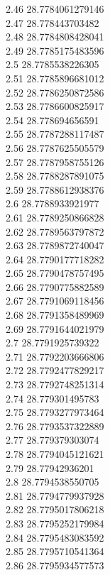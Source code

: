 {2.46	28.7784061279146\\
2.47	28.778443703482\\
2.48	28.7784808428041\\
2.49	28.7785175483596\\
2.5	28.7785538226305\\
2.51	28.7785896681012\\
2.52	28.7786250872586\\
2.53	28.7786600825917\\
2.54	28.778694656591\\
2.55	28.7787288117487\\
2.56	28.7787625505579\\
2.57	28.7787958755126\\
2.58	28.7788287891075\\
2.59	28.7788612938376\\
2.6	28.7788933921977\\
2.61	28.7789250866828\\
2.62	28.7789563797872\\
2.63	28.7789872740047\\
2.64	28.7790177718282\\
2.65	28.7790478757495\\
2.66	28.7790775882589\\
2.67	28.7791069118456\\
2.68	28.7791358489969\\
2.69	28.7791644021979\\
2.7	28.7791925739322\\
2.71	28.7792203666806\\
2.72	28.7792477829217\\
2.73	28.7792748251314\\
2.74	28.779301495783\\
2.75	28.7793277973464\\
2.76	28.7793537322889\\
2.77	28.779379303074\\
2.78	28.7794045121621\\
2.79	28.77942936201\\
2.8	28.7794538550705\\
2.81	28.7794779937928\\
2.82	28.7795017806218\\
2.83	28.7795252179984\\
2.84	28.7795483083592\\
2.85	28.7795710541364\\
2.86	28.7795934577573\\
}
